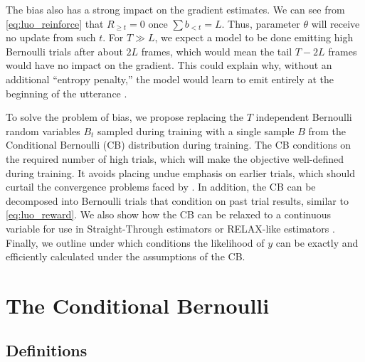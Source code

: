 \documentclass{article}
\begin{document}
The bias also has a strong impact on the gradient estimates. We can see from
\cref{eq:luo_reinforce} that $R_{\geq t} = 0$ once $\sum b_{<t} = L$. Thus,
parameter $\theta$ will receive no update from such $t$. For $T \gg L$, we
expect a model to be done emitting high Bernoulli trials after about $2L$
frames, which would mean the tail $T - 2L$ frames would have no impact on the
gradient. This could explain why, without an additional ``entropy penalty,''
the model would learn to emit entirely at the beginning of the utterance
\cite{luoLearningOnlineAlignments2017}.

To solve the problem of bias, we propose replacing the $T$ independent
Bernoulli random variables $B_t$ sampled during training with a single sample
$B$ from the Conditional Bernoulli (CB) distribution during training. The CB
conditions on the required number of high trials, which will make the objective
well-defined during training. It avoids placing undue emphasis on earlier
trials, which should curtail the convergence problems faced by
\citet{luoLearningOnlineAlignments2017}. In addition, the CB can be decomposed
into Bernoulli trials that condition on past trial results, similar to
\cref{eq:luo_reward}. We also show how the CB can be relaxed to a continuous
variable for use in Straight-Through estimators
\cite{bengioEstimatingPropagatingGradients2013,jangCategoricalReparameterizationGumbelSoftmax2017}
or RELAX-like estimators
\cite{maddisonConcreteDistributionContinuous2017,grathwohlBackpropagationVoidOptimizing2018}.
Finally, we outline under which conditions the likelihood of $y$ can be
exactly and efficiently calculated under the assumptions of the CB.

\section{The Conditional Bernoulli} \label{sec:cb}
\subsection{Definitions} \label{sec:cb_defns}
\end{document}
